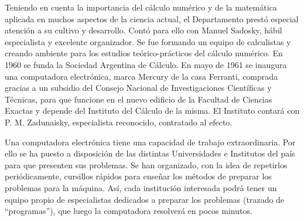 Teniendo en cuenta la importancia del cálculo numérico y de la matemática
aplicada en muchos aspectos de la ciencia actual, el Departamento prestó
especial atención a su cultivo y desarrollo. Contó para ello con Manuel
Sadosky, hábil especialista y excelente organizador. Se fue formando un equipo
de calculistas y creando ambiente para los estudios teórico-prácticos del
cálculo numérico. En 1960 se funda la Sociedad Argentina de Cálculo. En mayo de
1961 se inaugura una computadora electrónica, marca Mercury de la casa
Ferranti, comprada gracias a un subsidio del Consejo Nacional de
Investigaciones Científicas y Técnicas, para que funcione en el nuevo edificio
de la Facultad de Ciencias Exactas y depende del Instituto del Cálculo de la
misma. El Instituto contará con P. M. Zadunaisky, especialista reconocido,
contratado al efecto.

Una computadora electrónica tiene una capacidad de trabajo extraordinaria. Por
ello se ha puesto a disposición de las distintas Universidades e Institutos del
país para que presenten sus problemas. Se han organizado, con la idea de
repetirlos periódicamente, cursillos rápidos para enseñar los métodos de
preparar los problemas para la máquina. Así, cada institución interesada podrá
tener un equipo propio de especialistas dedicados a preparar los problemas
(trazado de ``programas''), que luego la computadora resolverá en pocos
minutos.

